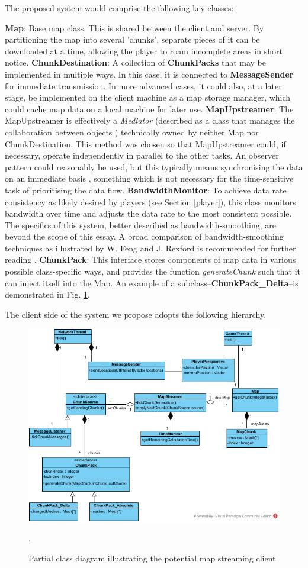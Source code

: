\documentclass{scrartcl}
\begin{document}
The proposed system would comprise the following key classes:

\textbf{Map}: Base map class. This is shared between the client and server. By partitioning the map into several 'chunks', separate pieces of it can be downloaded at a time, allowing the player to roam incomplete areas in short notice.
\textbf{ChunkDestination}: A collection of \textbf{ChunkPacks} that may be implemented in multiple ways. In this case, it is connected to \textbf{MessageSender} for immediate transmission. In more advanced cases, it could also, at a later stage, be implemented on the client machine as a map storage manager, which could cache map data on a local machine for later use.
\textbf{MapUpstreamer}: The MapUpstreamer is effectively a \textit{Mediator} (described as a class that manages the collaboration between objects \cite{designpatterns}) technically owned by neither Map nor ChunkDestination. This method was chosen so that MapUpstreamer could, if necessary, operate independently in parallel to the other tasks. An observer pattern could reasonably be used, but this typically means synchronising the data on an immediate basis \cite{designpatterns}, something which is not necessary for the time-sensitive task of prioritising the data flow.
\textbf{BandwidthMonitor}: To achieve data rate consistency as likely desired by players (see Section \ref{player}), this class monitors bandwidth over time and adjusts the data rate to the most consistent possible. The specifics of this system, better described as bandwidth-smoothing, are beyond the scope of this essay. A broad comparison of bandwidth-smoothing techniques as illustrated by W. Feng and J. Rexford is recommended for further reading \cite{bandwidthsmoothing}.
\textbf{ChunkPack}: This interface stores components of map data in various possible class-specific ways, and provides the function \textit{generateChunk} such that it can inject itself into the Map. An example of a subclass--\textbf{ChunkPack_Delta}--is demonstrated in Fig. \ref{fig:clientsystem}.

The client side of the system we propose adopts the following hierarchy.

\begin{figure}
	\centering
	\includegraphics[width=0.7\linewidth]{Client_Side_Streamer.png}
	\caption{Partial class diagram illustrating the potential map streaming client},
	\label{fig:clientsystem}
\end{figure}
\end{document}
